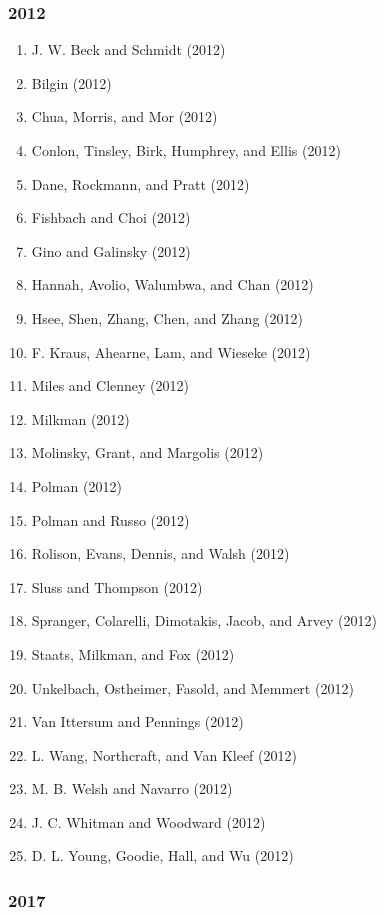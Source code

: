 \documentclass[english,man]{apa6}
\providecommand{\tightlist}{%
  \setlength{\itemsep}{0pt}\setlength{\parskip}{0pt}}
\theoremstyle{definition}
\theoremstyle{definition}
\theoremstyle{definition}
\theoremstyle{remark}
\begin{document}
\subsubsection{2012}\label{section-28}

\begin{enumerate}
\def\labelenumi{\arabic{enumi})}
\tightlist
\item
  J. W. Beck and Schmidt (2012)
\item
  Bilgin (2012)
\item
  Chua, Morris, and Mor (2012)
\item
  Conlon, Tinsley, Birk, Humphrey, and Ellis (2012)
\item
  Dane, Rockmann, and Pratt (2012)
\item
  Fishbach and Choi (2012)
\item
  Gino and Galinsky (2012)
\item
  Hannah, Avolio, Walumbwa, and Chan (2012)
\item
  Hsee, Shen, Zhang, Chen, and Zhang (2012)
\item
  F. Kraus, Ahearne, Lam, and Wieseke (2012)
\item
  Miles and Clenney (2012)
\item
  Milkman (2012)
\item
  Molinsky, Grant, and Margolis (2012)
\item
  Polman (2012)
\item
  Polman and Russo (2012)
\item
  Rolison, Evans, Dennis, and Walsh (2012)
\item
  Sluss and Thompson (2012)
\item
  Spranger, Colarelli, Dimotakis, Jacob, and Arvey (2012)
\item
  Staats, Milkman, and Fox (2012)
\item
  Unkelbach, Ostheimer, Fasold, and Memmert (2012)
\item
  Van Ittersum and Pennings (2012)
\item
  L. Wang, Northcraft, and Van Kleef (2012)
\item
  M. B. Welsh and Navarro (2012)
\item
  J. C. Whitman and Woodward (2012)
\item
  D. L. Young, Goodie, Hall, and Wu (2012)
\end{enumerate}

\subsubsection{2017}\label{section-29}
\end{document}

